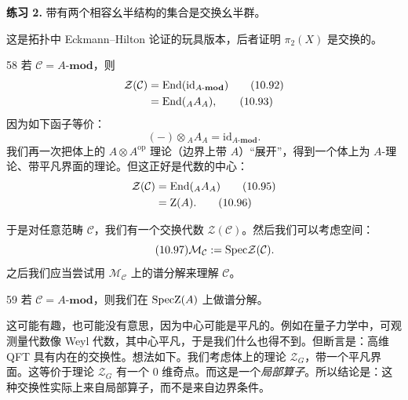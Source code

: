 \textbf{练习 2.} 带有两个相容幺半结构的集合是交换幺半群。

这是拓扑中 Eckmann--Hilton 论证的玩具版本，后者证明 $\pi_2(X)$ 是交换的。


\begin{srcex}{58}
若 $\mathcal{C}=A\text{-}\mathbf{mod}$，则
\begin{align}
\mathcal{Z}(\mathcal{C})&=\mathrm{End}(\mathrm{id}_{A\text{-}\mathbf{mod}})\tag{10.92}\\
&=\mathrm{End}({}_A A_A),\tag{10.93}
\end{align}
因为如下函子等价：
\begin{equation}\tag{10.94}
(-)\otimes{}_A A_A=\mathrm{id}_{A\text{-}\mathbf{mod}}.
\end{equation}
我们再一次把体上的 $A\otimes A^{\mathrm{op}}$ 理论（边界上带 $A$）“展开”，得到一个体上为 $A$-理论、带平凡界面的理论。但这正好是代数的中心：
\begin{align}
\mathcal{Z}(\mathcal{C})&=\mathrm{End}({}_A A_A)\tag{10.95}\\
&=\mathrm{Z}(A).\tag{10.96}
\end{align}
\end{srcex}

于是对任意范畴 $\mathcal{C}$，我们有一个交换代数 $\mathcal{Z}(\mathcal{C})$。然后我们可以考虑空间：
\begin{equation}\tag{10.97}
\mathcal{M}_{\mathcal{C}}:=\mathrm{Spec}\mathcal{Z}(\mathcal{C}).
\end{equation}
之后我们应当尝试用 $\mathcal{M}_{\mathcal{C}}$ 上的谱分解来理解 $\mathcal{C}$。

\begin{srcex}{59}
若 $\mathcal{C}=A\text{-}\mathbf{mod}$，则我们在 $\mathrm{Spec}\mathrm{Z}(A)$ 上做谱分解。
\end{srcex}

这可能有趣，也可能没有意思，因为中心可能是平凡的。例如在量子力学中，可观测量代数像 Weyl 代数，其中心平凡，于是我们什么也得不到。但断言是：高维 QFT 具有内在的交换性。想法如下。我们考虑体上的理论 $\mathcal{Z}_G$，带一个平凡界面。这等价于理论 $\mathcal{Z}_G$ 有一个 $0$ 维奇点。而这是一个\emph{局部算子}。所以结论是：这种交换性实际上来自局部算子，而不是来自边界条件。

